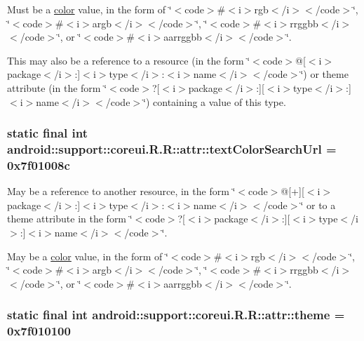 Must be a \hyperlink{classandroid_1_1support_1_1coreui_1_1_r_1_1color}{color} value, in the form of \char`\"{}$<$code$>$\#$<$i$>$rgb$<$/i$>$$<$/code$>$\char`\"{}, \char`\"{}$<$code$>$\#$<$i$>$argb$<$/i$>$$<$/code$>$\char`\"{}, \char`\"{}$<$code$>$\#$<$i$>$rrggbb$<$/i$>$$<$/code$>$\char`\"{}, or \char`\"{}$<$code$>$\#$<$i$>$aarrggbb$<$/i$>$$<$/code$>$\char`\"{}. 

This may also be a reference to a resource (in the form \char`\"{}$<$code$>$@\mbox{[}$<$i$>$package$<$/i$>$:\mbox{]}$<$i$>$type$<$/i$>$:$<$i$>$name$<$/i$>$$<$/code$>$\char`\"{}) or theme attribute (in the form \char`\"{}$<$code$>$?\mbox{[}$<$i$>$package$<$/i$>$:\mbox{]}\mbox{[}$<$i$>$type$<$/i$>$:\mbox{]}$<$i$>$name$<$/i$>$$<$/code$>$\char`\"{}) containing a value of this type. \hypertarget{classandroid_1_1support_1_1coreui_1_1_r_1_1attr_9b374e473ff8038302028dcb7201b4b4}{
\subsubsection[{textColorSearchUrl}]{\setlength{\rightskip}{0pt plus 5cm}static final int android::support::coreui.R.R::attr::textColorSearchUrl = 0x7f01008c}}
\label{classandroid_1_1support_1_1coreui_1_1_r_1_1attr_9b374e473ff8038302028dcb7201b4b4}


May be a reference to another resource, in the form \char`\"{}$<$code$>$@\mbox{[}+\mbox{]}\mbox{[}$<$i$>$package$<$/i$>$:\mbox{]}$<$i$>$type$<$/i$>$:$<$i$>$name$<$/i$>$$<$/code$>$\char`\"{} or to a theme attribute in the form \char`\"{}$<$code$>$?\mbox{[}$<$i$>$package$<$/i$>$:\mbox{]}\mbox{[}$<$i$>$type$<$/i$>$:\mbox{]}$<$i$>$name$<$/i$>$$<$/code$>$\char`\"{}. 

May be a \hyperlink{classandroid_1_1support_1_1coreui_1_1_r_1_1color}{color} value, in the form of \char`\"{}$<$code$>$\#$<$i$>$rgb$<$/i$>$$<$/code$>$\char`\"{}, \char`\"{}$<$code$>$\#$<$i$>$argb$<$/i$>$$<$/code$>$\char`\"{}, \char`\"{}$<$code$>$\#$<$i$>$rrggbb$<$/i$>$$<$/code$>$\char`\"{}, or \char`\"{}$<$code$>$\#$<$i$>$aarrggbb$<$/i$>$$<$/code$>$\char`\"{}. \hypertarget{classandroid_1_1support_1_1coreui_1_1_r_1_1attr_056408cb0b4505a0ce5b53f6f4d1f675}{
\subsubsection[{theme}]{\setlength{\rightskip}{0pt plus 5cm}static final int android::support::coreui.R.R::attr::theme = 0x7f010100}}
\label{classandroid_1_1support_1_1coreui_1_1_r_1_1attr_056408cb0b4505a0ce5b53f6f4d1f675}


